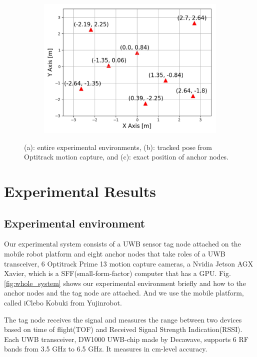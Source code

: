 \documentclass[letterpaper, 10 pt, conference]{ieeeconf}  %
\begin{document}
\begin{figure}[h]
\begin{subfigure}[b]{0.32\textwidth}
		\includegraphics[width=\textwidth]{image/system_exact_position}
		\caption{}
		\label{fig:Exact_position}
	\end{subfigure}
	\caption{(a): entire experimental environments, (b): tracked pose from Optitrack motion capture, and (c): exact position of anchor nodes. }\label{fig:animals22}
\end{figure}

\section{Experimental Results}
\subsection{Experimental environment}

Our experimental system consists of a UWB sensor tag node attached on the mobile robot platform  and eight anchor nodes that take roles of a UWB transceiver, 6 Optitrack Prime 13 motion capture cameras, a Nvidia Jetson AGX Xavier, which is a SFF(small-form-factor) computer that has a GPU. Fig. \ref{fig:whole_system} shows our experimental environment briefly and how to the anchor nodes and the tag node are attached. And we use the mobile platform, called iClebo Kobuki from Yujinrobot.

The tag node receives the signal and measures the range between two devices based on time of flight(TOF) and Received Signal Strength Indication(RSSI). Each UWB transceiver, DW1000 UWB-chip made by Decawave, supports 6 RF bands from 3.5 GHz to 6.5 GHz. It measures in cm-level accuracy.
\end{document}
